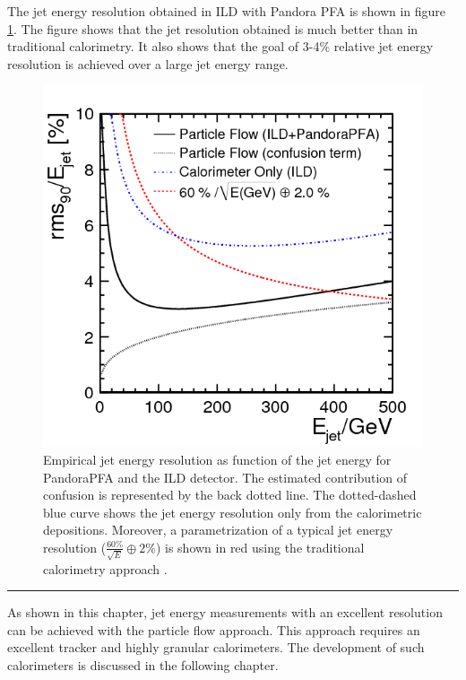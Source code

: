 The jet energy resolution obtained in ILD with Pandora PFA is shown in figure \ref{fig:ILDPFA}. The figure shows that the jet resolution obtained is much better than in traditional calorimetry. It also shows that the goal of 3-4\% relative jet energy resolution is achieved over a large jet energy range.

\begin{figure}[htbp!]
  \centering
  \includegraphics[width=0.6\linewidth]{chap2/fig/pfa_figure_10.png}
  \caption{Empirical jet energy resolution as function of the jet energy for PandoraPFA and the ILD detector. The estimated contribution of confusion is represented by the back dotted line. The dotted-dashed blue curve shows the jet energy resolution only from the calorimetric depositions. Moreover, a parametrization of a typical jet energy resolution ($\frac{60\%}{\sqrt{E}} \oplus 2\%$) is shown in red using the traditional calorimetry approach \cite{Thomson:2009rp}.} \label{fig:ILDPFA}
\end{figure}

\begin{center}
  \rule{0.5\textwidth}{.4pt}
\end{center}

As shown in this chapter, jet energy measurements with an excellent resolution can be achieved with the particle flow approach. This approach requires an excellent tracker and highly granular calorimeters. The development of such calorimeters is discussed in the following chapter.
